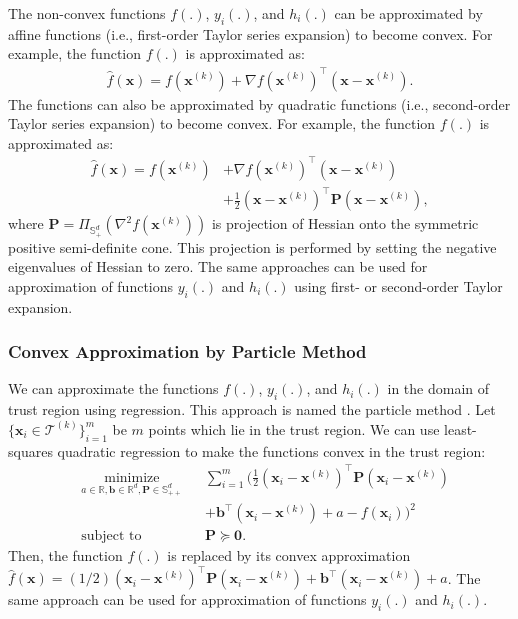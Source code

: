\documentclass[lang=cn,10pt]{gorgeousnbook}
\numberwithin{equation}{section}%
\numberwithin{figure}{section}%
\begin{document}
The non-convex functions $f(.)$, $y_i(.)$, and $h_i(.)$ can be approximated by affine functions (i.e., first-order Taylor series expansion) to become convex. For example, the function $f(.)$ is approximated as:
\begin{align}
\widehat{f}(\boldsymbol{x}) = {f}(\boldsymbol{x}^{(k)}) + \nabla f(\boldsymbol{x}^{(k)})^\top (\boldsymbol{x} - \boldsymbol{x}^{(k)}).
\end{align}
The functions can also be approximated by quadratic functions (i.e., second-order Taylor series expansion) to become convex. For example, the function $f(.)$ is approximated as:
\begin{align}
\widehat{f}(\boldsymbol{x}) = {f}(\boldsymbol{x}^{(k)}) &+ \nabla f(\boldsymbol{x}^{(k)})^\top (\boldsymbol{x} - \boldsymbol{x}^{(k)}) \nonumber\\
&+ \frac{1}{2} (\boldsymbol{x} - \boldsymbol{x}^{(k)})^\top \boldsymbol{P} (\boldsymbol{x} - \boldsymbol{x}^{(k)}),
\end{align}
where $\boldsymbol{P} = \Pi_{\mathbb{S}_{+}^d}(\nabla^2 f(\boldsymbol{x}^{(k)}))$ is projection of Hessian onto the symmetric positive semi-definite cone. This projection is performed by setting the negative eigenvalues of Hessian to zero. 
The same approaches can be used for approximation of functions $y_i(.)$ and $h_i(.)$ using first- or second-order Taylor expansion. 

\subsubsection{Convex Approximation by Particle Method}

We can approximate the functions $f(.)$, $y_i(.)$, and $h_i(.)$ in the domain of trust region using regression. This approach is named the particle method \cite{duchi2018sequential}. Let $\{\boldsymbol{x}_i \in \mathcal{T}^{(k)}\}_{i=1}^m$ be $m$ points which lie in the trust region. 
We can use  least-squares quadratic regression to make the functions convex in the trust region:
\begin{equation}
\begin{aligned}
& \underset{a \in \mathbb{R}, \boldsymbol{b} \in \mathbb{R}^d, \boldsymbol{P} \in \mathbb{S}_{++}^d}{\text{minimize}}
& & \sum_{i=1}^m \Big(\frac{1}{2} (\boldsymbol{x}_i - \boldsymbol{x}^{(k)})^\top \boldsymbol{P} (\boldsymbol{x}_i - \boldsymbol{x}^{(k)}) \\
& & &+ \boldsymbol{b}^\top (\boldsymbol{x}_i - \boldsymbol{x}^{(k)}) + a - f(\boldsymbol{x}_i)\Big)^2 \\
& \text{subject to}
& & \boldsymbol{P} \succeq \boldsymbol{0}.
\end{aligned}
\end{equation}
Then, the function $f(.)$ is replaced by its convex approximation $\widehat{f}(\boldsymbol{x}) = (1/2) (\boldsymbol{x}_i - \boldsymbol{x}^{(k)})^\top \boldsymbol{P} (\boldsymbol{x}_i - \boldsymbol{x}^{(k)}) + \boldsymbol{b}^\top (\boldsymbol{x}_i - \boldsymbol{x}^{(k)}) + a$. The same approach can be used for approximation of functions $y_i(.)$ and $h_i(.)$.
\end{document}
